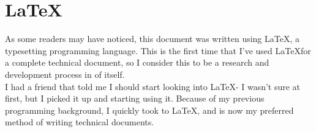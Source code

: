 		\chapter{LaTeX}
			As some readers may have noticed, this document was written using \LaTeX, a typesetting programming language. This is the first time that I've used \LaTeX for a complete technical document, so I consider this to be a research and development process in of itself.\\
			
			I had a friend that told me I should start looking into \LaTeX - I wasn't sure at first, but I picked it up and starting using it. Because of my previous programming background, I quickly took to LaTeX, and is now my preferred method of writing technical documents.\\	